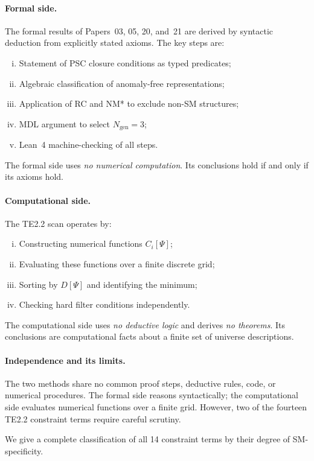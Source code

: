 \documentclass[11pt,twocolumn]{article}
\theoremstyle{remark}
\begin{document}
\paragraph{Formal side.}
The formal results of Papers~03, 05, 20, and~21 are derived by
syntactic deduction from explicitly stated axioms.
The key steps are:
\begin{enumerate}[(i)]
  \item Statement of PSC closure conditions as typed predicates;
  \item Algebraic classification of anomaly-free representations;
  \item Application of RC and NM* to exclude non-SM structures;
  \item MDL argument to select $N_{\mathrm{gen}}=3$;
  \item Lean~4 machine-checking of all steps.
\end{enumerate}
The formal side uses \emph{no numerical computation}.
Its conclusions hold if and only if its axioms hold.

\paragraph{Computational side.}
The TE2.2 scan operates by:
\begin{enumerate}[(i)]
  \item Constructing numerical functions $C_i[\Psi]$;
  \item Evaluating these functions over a finite discrete grid;
  \item Sorting by $D[\Psi]$ and identifying the minimum;
  \item Checking hard filter conditions independently.
\end{enumerate}
The computational side uses \emph{no deductive logic} and derives
\emph{no theorems}.
Its conclusions are computational facts about a finite set of
universe descriptions.

\paragraph{Independence and its limits.}
The two methods share no common proof steps, deductive rules, code,
or numerical procedures.
The formal side reasons syntactically; the computational side
evaluates numerical functions over a finite grid.
However, two of the fourteen TE2.2 constraint terms require
careful scrutiny.

We give a complete classification of all 14 constraint terms by
their degree of SM-specificity.
\end{document}
